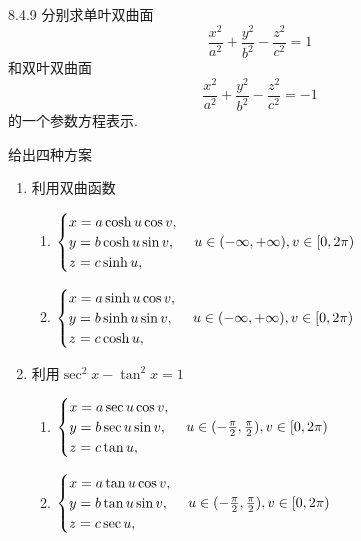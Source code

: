 \begin{exercise}{8.4.9}
    分别求单叶双曲面$$\frac{x^2}{a^2}+\frac{y^2}{b^2}-\frac{z^2}{c^2}=1$$和双叶双曲面$$\frac{x^2}{a^2}+\frac{y^2}{b^2}-\frac{z^2}{c^2}=-1$$的一个参数方程表示.
\end{exercise}
\begin{solution}
    给出四种方案
    \begin{enumerate}
        \item 利用双曲函数
        \begin{multicols}{2}
              \begin{enumerate}
            \item[单叶] 
            $\begin{cases}
                x=a\cosh u\cos v,\\
                y=b\cosh u\sin v,\\
                z=c\sinh u,\\
            \end{cases}\\u\in(-\infty,+\infty),v\in[0,2\pi)$
            \item[双叶] 
            $\begin{cases}
                x=a\sinh u\cos v,\\
                y=b\sinh u\sin v,\\
                z=c\cosh u,\\
            \end{cases}\\u\in(-\infty,+\infty),v\in[0,2\pi)$
        \end{enumerate}
        \end{multicols}

        \item 利用$\sec^2x-\tan^2x=1$
        \begin{multicols}{2}
              \begin{enumerate}
            \item[单叶] 
            $\begin{cases}
                x=a\sec u\cos v,\\
                y=b\sec u\sin v,\\
                z=c\tan u,\\
            \end{cases}\\u\in(-\frac{\pi}{2},\frac{\pi}{2}),v\in[0,2\pi)$
            \item[双叶] 
            $\begin{cases}
                x=a\tan u\cos v,\\
                y=b\tan u\sin v,\\
                z=c\sec u,\\
            \end{cases}\\u\in(-\frac{\pi}{2},\frac{\pi}{2}),v\in[0,2\pi)$
        \end{enumerate}
        \end{multicols}


\end{enumerate}
\end{solution}
